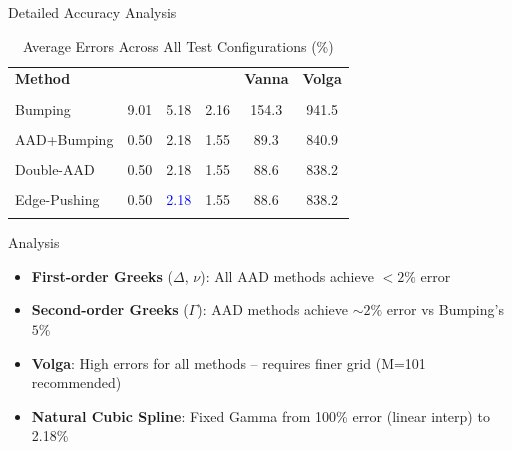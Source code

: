 \documentclass[aspectratio=169]{beamer}
\begin{document}
\begin{frame}{Detailed Accuracy Analysis}
\begin{table}
\centering
\caption{Average Errors Across All Test Configurations (\%)}
\begin{tabular}{lccccc}
\toprule
\textbf{Method} & \boldmath{$\Delta$} & \boldmath{$\Gamma$} & \boldmath{$\nu$} & \textbf{Vanna} & \textbf{Volga} \\\\
\midrule
Bumping         & 9.01 & 5.18 & 2.16 & 154.3 & 941.5 \\\\
AAD+Bumping     & 0.50 & 2.18 & 1.55 & 89.3 & 840.9 \\\\
Double-AAD      & 0.50 & 2.18 & 1.55 & 88.6 & 838.2 \\\\
Edge-Pushing    & 0.50 & \textcolor{blue}{2.18} & 1.55 & 88.6 & 838.2 \\\\
\bottomrule
\end{tabular}
\end{table}

\begin{block}{Analysis}
\begin{itemize}
    \item \textbf{First-order Greeks} ($\Delta$, $\nu$): All AAD methods achieve $<2\%$ error
    \item \textbf{Second-order Greeks} ($\Gamma$): AAD methods achieve $\sim2\%$ error vs Bumping's $5\%$
    \item \textbf{Volga}: High errors for all methods -- requires finer grid (M=101 recommended)
    \item \textbf{Natural Cubic Spline}: Fixed Gamma from 100\% error (linear interp) to 2.18\%
\end{itemize}
\end{block}
\end{frame}
\end{document}
